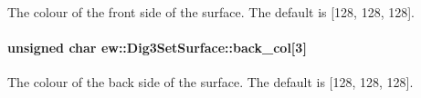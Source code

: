 \label{classew_1_1Dig3SetSurface_aa067f664f7409bdab4f31a2facfc981d}
The colour of the front side of the surface. The default is \mbox{[}128, 128, 128\mbox{]}. \hypertarget{classew_1_1Dig3SetSurface_ab5bb87bc9fb4bbf52dde7106f3cc4be1}{
\paragraph[{back\_\-col}]{\setlength{\rightskip}{0pt plus 5cm}unsigned char {\bf ew::Dig3SetSurface::back\_\-col}\mbox{[}3\mbox{]}}\hfill}
\label{classew_1_1Dig3SetSurface_ab5bb87bc9fb4bbf52dde7106f3cc4be1}
The colour of the back side of the surface. The default is \mbox{[}128, 128, 128\mbox{]}. 